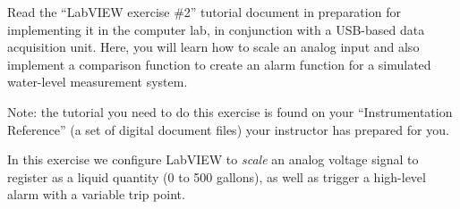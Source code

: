 

Read the ``LabVIEW exercise \#2'' tutorial document in preparation for implementing it in the computer lab, in conjunction with a USB-based data acquisition unit.  Here, you will learn how to scale an analog input and also implement a comparison function to create an alarm function for a simulated water-level measurement system.

\vskip 10pt

Note: the tutorial you need to do this exercise is found on your ``Instrumentation Reference'' (a set of digital document files) your instructor has prepared for you.














In this exercise we configure LabVIEW to {\it scale} an analog voltage signal to register as a liquid quantity (0 to 500 gallons), as well as trigger a high-level alarm with a variable trip point.



